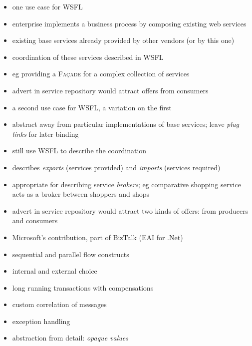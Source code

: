 \documentclass{sepslide-soa-faked} %
\begin{document}
\begin{slide}
\begin{itemize}
\item one use case for WSFL
\item enterprise implements a business process by composing existing web
  services 
\item existing base services already provided by other vendors (or by this one)
\item coordination of these services described in WSFL
\item eg providing a \textsc{Fa\c cade} for a complex collection of services
\item advert in service repository would attract offers from consumers 
\end{itemize}
\end{slide}

\begin{slide}
\begin{itemize}
\item a second use case for WSFL, a variation on the first
\item abstract away from particular implementations of base services;
  leave \emph{plug links} for later binding
\item still use WSFL to describe the coordination
\item describes \emph{exports} (services provided) and \emph{imports}
  (services required)
\item appropriate for describing service \emph{brokers};
  eg comparative shopping service acts as a broker between shoppers and
  shops 
\item advert in service repository would attract two kinds
  of offers: from producers and consumers
\end{itemize}
\end{slide}

\begin{slide}
\begin{itemize}
\item Microsoft's contribution, part of BizTalk (EAI for .Net)
\item sequential and parallel flow constructs
\item internal and external choice
\item long running transactions with compensations
\item custom correlation of messages
\item exception handling
\item abstraction from detail: \emph{opaque values}
\end{itemize}
\end{slide}
\end{document}

